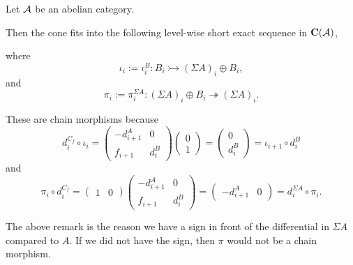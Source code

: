 \begin{remark}
    Let \( {\mathcal{A}} \) be an abelian category.

    Then the cone fits into the following level-wise short exact sequence in \( \operatorname{\mathbf{C}}({\mathcal{A}}) \),
    \begin{center}
    \end{center}
    where
    \[
        \iota_i := \iota_i^B: B_i \rightarrowtail (\Sigma A)_i \oplus B_i,
    \]
    and
    \[
        \pi_i := \pi_i^{\Sigma A}: (\Sigma A)_i \oplus B_i \twoheadrightarrow (\Sigma A)_i.
    \]

    These are chain morphisms because
    \[
        d_i^{C_f} \circ \iota_i =
        \begin{pmatrix}
            -d_{i + 1}^A & 0 \\
            f_{i + 1} & d_i^B
        \end{pmatrix}
        \begin{pmatrix}
            0 \\
            1
        \end{pmatrix}
        =
        \begin{pmatrix}
            0 \\
            d_i^B
        \end{pmatrix}
        =
        \iota_{i + 1} \circ d_i^B
    \]
    and
    \[
        \pi_i \circ d_i^{C_f} =
        \begin{pmatrix}
            1 & 0
        \end{pmatrix}
        \begin{pmatrix}
            -d_{i + 1}^A & 0 \\
            f_{i + 1} & d_i^B
        \end{pmatrix}
        =
        \begin{pmatrix}
            -d_{i + 1}^A & 0
        \end{pmatrix}
        = d_i^{\Sigma A} \circ \pi_i.
    \]
\end{remark}

The above remark is the reason we have a sign in front of the differential in \( \Sigma A \) compared to \( A \). If we did not have the sign, then \( \pi \) would not be a chain morphism.

